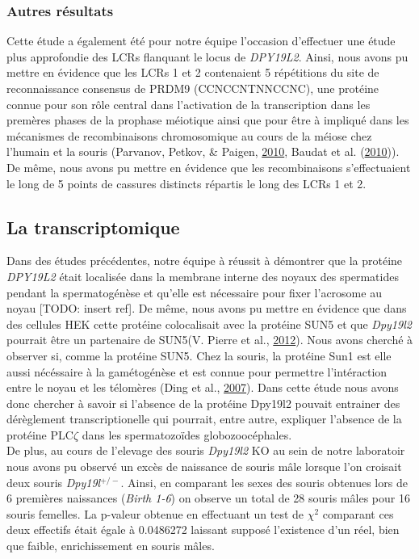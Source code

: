 \documentclass[12pt,twoside]{reedthesis}
\theoremstyle{definition}
\theoremstyle{definition}
\theoremstyle{remark}
\begin{document}
  \subsubsection{Autres résultats}\label{autres-resultats}
  
  Cette étude a également été pour notre équipe l'occasion d'effectuer une
  étude plus approfondie des LCRs flanquant le locus de \emph{DPY19L2}.
  Ainsi, nous avons pu mettre en évidence que les LCRs 1 et 2 contenaient
  5 répétitions du site de reconnaissance consensus de PRDM9
  (CCNCCNTNNCCNC), une protéine connue pour son rôle central dans
  l'activation de la transcription dans les premères phases de la prophase
  méiotique ainsi que pour être à impliqué dans les mécanismes de
  recombinaisons chromosomique au cours de la méiose chez l'humain et la
  souris (Parvanov, Petkov, \& Paigen,
  \protect\hyperlink{ref-Parvanov2010}{2010}, Baudat et al.
  (\protect\hyperlink{ref-Baudat2010}{2010})). De même, nous avons pu
  mettre en évidence que les recombinaisons s'effectuaient le long de 5
  points de cassures distincts répartis le long des LCRs 1 et 2.
  
  \newpage
  
  \hypertarget{transcriptome}{\subsection{La
  transcriptomique}\label{transcriptome}}
  
  Dans des études précédentes, notre équipe à réussit à démontrer que la
  protéine \emph{DPY19L2} était localisée dans la membrane interne des
  noyaux des spermatides pendant la spermatogénèse et qu'elle est
  nécessaire pour fixer l'acrosome au noyau {[}TODO: insert ref{]}. De
  même, nous avons pu mettre en évidence que dans des cellules HEK cette
  protéine colocalisait avec la protéine SUN5 et que \emph{Dpy19l2}
  pourrait être un partenaire de SUN5(V. Pierre et al.,
  \protect\hyperlink{ref-Pierre2012}{2012}). Nous avons cherché à observer
  si, comme la protéine SUN5. Chez la souris, la protéine Sun1 est elle
  aussi nécéssaire à la gamétogénèse et est connue pour permettre
  l'intéraction entre le noyau et les télomères (Ding et al.,
  \protect\hyperlink{ref-Ding2007}{2007}). Dans cette étude nous avons
  donc chercher à savoir si l'absence de la protéine Dpy19l2 pouvait
  entrainer des dérèglement transcriptionelle qui pourrait, entre autre,
  expliquer l'absence de la protéine PLC\(\zeta\) dans les spermatozoïdes
  globozoocéphales.\\
  De plus, au cours de l'elevage des souris \emph{Dpy19l2} KO au sein de
  notre laboratoir nous avons pu observé un excès de naissance de souris
  mâle lorsque l'on croisait deux souris \emph{Dpy19l}\(^{+/-}\). Ainsi,
  en comparant les sexes des souris obtenues lors de 6 premières
  naissances (\emph{Birth 1-6}) on observe un total de 28 souris mâles
  pour 16 souris femelles. La p-valeur obtenue en effectuant un test de
  \(\chi^2\) comparant ces deux effectifs était égale à 0.0486272 laissant
  supposé l'existence d'un réel, bien que faible, enrichissement en souris
  mâles.
  
\end{document}
